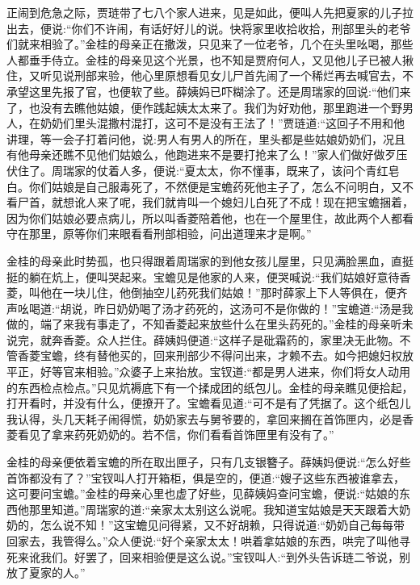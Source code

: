 \begin{parag}
    正闹到危急之际，贾琏带了七八个家人进来，见是如此，便叫人先把夏家的儿子拉出去，便说:“你们不许闹，有话好好儿的说。快将家里收拾收拾，刑部里头的老爷们就来相验了。”金桂的母亲正在撒泼，只见来了一位老爷，几个在头里吆喝，那些人都垂手侍立。金桂的母亲见这个光景，也不知是贾府何人，又见他儿子已被人揪住，又听见说刑部来验，他心里原想看见女儿尸首先闹了一个稀烂再去喊官去，不承望这里先报了官，也便软了些。薛姨妈已吓糊涂了。还是周瑞家的回说:“他们来了，也没有去瞧他姑娘，便作践起姨太太来了。我们为好劝他，那里跑进一个野男人，在奶奶们里头混撒村混打，这可不是没有王法了！”贾琏道:“这回子不用和他讲理，等一会子打着问他，说:男人有男人的所在，里头都是些姑娘奶奶们，况且有他母亲还瞧不见他们姑娘么，他跑进来不是要打抢来了么！”家人们做好做歹压伏住了。周瑞家的仗着人多，便说:“夏太太，你不懂事，既来了，该问个青红皂白。你们姑娘是自己服毒死了，不然便是宝蟾药死他主子了，怎么不问明白，又不看尸首，就想讹人来了呢，我们就肯叫一个媳妇儿白死了不成！现在把宝蟾捆着，因为你们姑娘必要点病儿，所以叫香菱陪着他，也在一个屋里住，故此两个人都看守在那里，原等你们来眼看看刑部相验，问出道理来才是啊。”
\end{parag}


\begin{parag}
    金桂的母亲此时势孤，也只得跟着周瑞家的到他女孩儿屋里，只见满脸黑血，直挺挺的躺在炕上，便叫哭起来。宝蟾见是他家的人来，便哭喊说:“我们姑娘好意待香菱，叫他在一块儿住，他倒抽空儿药死我们姑娘！”那时薛家上下人等俱在，便齐声吆喝道:“胡说，昨日奶奶喝了汤才药死的，这汤可不是你做的！”宝蟾道:“汤是我做的，端了来我有事走了，不知香菱起来放些什么在里头药死的。”金桂的母亲听未说完，就奔香菱。众人拦住。薛姨妈便道:“这样子是砒霜药的，家里决无此物。不管香菱宝蟾，终有替他买的，回来刑部少不得问出来，才赖不去。如今把媳妇权放平正，好等官来相验。”众婆子上来抬放。宝钗道:“都是男人进来，你们将女人动用的东西检点检点。”只见炕褥底下有一个揉成团的纸包儿。金桂的母亲瞧见便拾起，打开看时，并没有什么，便撩开了。宝蟾看见道:“可不是有了凭据了。这个纸包儿我认得，头几天耗子闹得慌，奶奶家去与舅爷要的，拿回来搁在首饰匣内，必是香菱看见了拿来药死奶奶的。若不信，你们看看首饰匣里有没有了。”
\end{parag}


\begin{parag}
    金桂的母亲便依着宝蟾的所在取出匣子，只有几支银簪子。薛姨妈便说:“怎么好些首饰都没有了？”宝钗叫人打开箱柜，俱是空的，便道:“嫂子这些东西被谁拿去，这可要问宝蟾。”金桂的母亲心里也虚了好些，见薛姨妈查问宝蟾，便说:“姑娘的东西他那里知道。”周瑞家的道:“亲家太太别这么说呢。我知道宝姑娘是天天跟着大奶奶的，怎么说不知！”这宝蟾见问得紧，又不好胡赖，只得说道:“奶奶自己每每带回家去，我管得么。”众人便说:“好个亲家太太！哄着拿姑娘的东西，哄完了叫他寻死来讹我们。好罢了，回来相验便是这么说。”宝钗叫人:“到外头告诉琏二爷说，别放了夏家的人。”
\end{parag}


